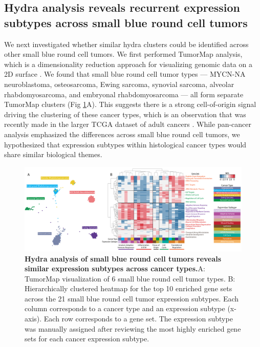 \documentclass[10pt,letterpaper]{article}
\begin{document}
\subsection*{Hydra analysis reveals recurrent expression subtypes across small blue round cell tumors}
We next investigated whether similar hydra clusters could be identified across other small blue round cell tumors. We first performed TumorMap analysis, which is a dimensionality reduction approach for visualizing genomic data on a 2D surface \cite{newtonTumorMapExploringMolecular2017}. We found that small blue round cell tumor types --- MYCN-NA neuroblastoma, osteosarcoma, Ewing sarcoma, synovial sarcoma, alveolar rhabdomyosarcoma, and embryonal rhabdomyosarcoma --- all form separate TumorMap clusters (Fig \ref{pancan}A). This suggests there is a strong cell-of-origin signal driving the clustering of these cancer types, which is an observation that was recently made in the larger TCGA dataset of adult cancers \cite{hoadleyCellofOriginPatternsDominate2018}. While pan-cancer analysis emphasized the differences across small blue round cell tumors, we hypothesized that expression subtypes within histological cancer types would share similar biological themes.

\begin{figure}[!h]
	\includegraphics[width=1.05\textwidth]{img/PNG/hydra-pan-small-round-blue-V2-2x}
	\caption{{\bf Hydra analysis of small blue round cell tumors reveals similar expression subtypes across cancer types.}A: TumorMap visualization of 6 small blue round cell tumor types. B: Hierarchically clustered heatmap for the top 10 enriched gene sets across the 21 small blue round cell tumor expression subtypes. Each column corresponds to a cancer type and an expression subtype (x-axis). Each row corresponds to a gene set. The expression subtype was manually assigned after reviewing the most highly enriched gene sets for each cancer expression subtype.}
	\label{pancan}
\end{figure}
\end{document}
